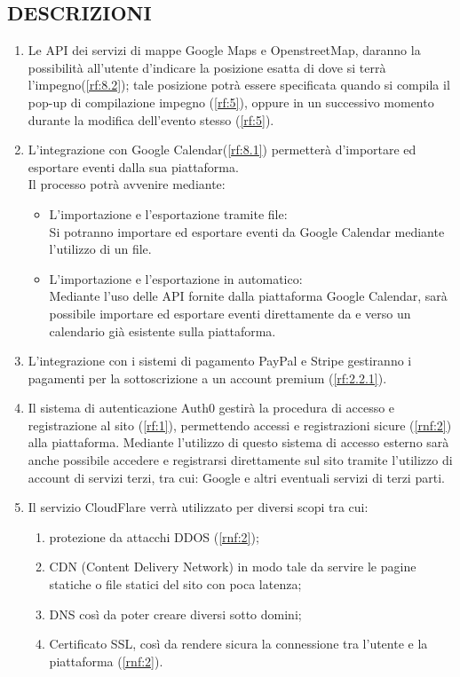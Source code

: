 \subsection*{DESCRIZIONI}
\begin{enumerate}
    \item Le API dei servizi di mappe Google Maps e OpenstreetMap, daranno la possibilità all'utente d'indicare la posizione esatta di dove si terrà l'impegno(\ref{rf:8.2}); tale posizione potrà essere specificata quando si compila il pop-up di compilazione impegno (\ref{rf:5}), oppure in un successivo momento durante la modifica dell'evento stesso (\ref{rf:5}).

    \item L'integrazione con Google Calendar(\ref{rf:8.1}) permetterà d'importare ed esportare eventi dalla sua piattaforma.\\
          Il processo potrà avvenire mediante:
          \begin{itemize}
              \item L'importazione e l'esportazione tramite file: \\
                    Si potranno importare ed esportare eventi da Google Calendar mediante l'utilizzo di un file.
              \item L'importazione e l'esportazione in automatico: \\
                    Mediante l'uso delle API fornite dalla piattaforma Google Calendar, sarà possibile importare ed esportare eventi direttamente da e verso un calendario già esistente sulla piattaforma.
          \end{itemize}

    \item L'integrazione con i sistemi di pagamento PayPal e Stripe gestiranno i pagamenti per la sottoscrizione a un account premium (\ref{rf:2.2.1}).

    \item Il sistema di autenticazione Auth0 gestirà la procedura di accesso e registrazione al sito (\ref{rf:1}), permettendo accessi e registrazioni sicure (\ref{rnf:2}) alla piattaforma. Mediante l'utilizzo di questo sistema di accesso esterno sarà anche possibile accedere e registrarsi direttamente sul sito tramite l'utilizzo di account di servizi terzi, tra cui: Google e altri eventuali servizi di terzi parti.

    \item Il servizio CloudFlare verrà utilizzato per diversi scopi tra cui:
          \begin{enumerate}
              \item protezione da attacchi DDOS (\ref{rnf:2});
              \item CDN (Content Delivery Network) in modo tale da servire le pagine statiche o file statici del sito con poca latenza;
              \item DNS così da poter creare diversi sotto domini;
              \item Certificato SSL, così da rendere sicura la connessione tra l'utente e la piattaforma (\ref{rnf:2}).
          \end{enumerate}


\end{enumerate}
